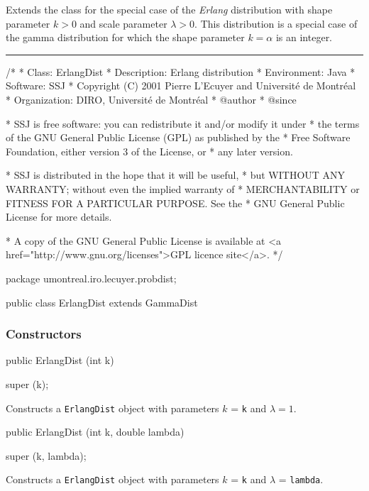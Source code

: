 
Extends the class  for the special case
of the {\em Erlang\/} distribution with
shape parameter $k > 0$ and scale parameter $\lambda > 0$.
This distribution is a special case of the gamma distribution
for which the shape parameter $k=\alpha$ is an integer.

\bigskip\hrule

\begin{code}
\begin{hide}
/*
 * Class:        ErlangDist
 * Description:  Erlang distribution
 * Environment:  Java
 * Software:     SSJ 
 * Copyright (C) 2001  Pierre L'Ecuyer and Université de Montréal
 * Organization: DIRO, Université de Montréal
 * @author       
 * @since

 * SSJ is free software: you can redistribute it and/or modify it under
 * the terms of the GNU General Public License (GPL) as published by the
 * Free Software Foundation, either version 3 of the License, or
 * any later version.

 * SSJ is distributed in the hope that it will be useful,
 * but WITHOUT ANY WARRANTY; without even the implied warranty of
 * MERCHANTABILITY or FITNESS FOR A PARTICULAR PURPOSE.  See the
 * GNU General Public License for more details.

 * A copy of the GNU General Public License is available at
   <a href="http://www.gnu.org/licenses">GPL licence site</a>.
 */
\end{hide}
package umontreal.iro.lecuyer.probdist;

public class ErlangDist extends GammaDist\begin{hide} {
\end{hide}\end{code}
\subsubsection* {Constructors}

\begin{code}

   public ErlangDist (int k)\begin{hide} {
      super (k);
   }\end{hide}
\end{code}
  \begin{tabb} Constructs a \texttt{ErlangDist} object with parameters
  $k$ = \texttt{k} and $\lambda=1$.
  \end{tabb}
\begin{code}

   public ErlangDist (int k, double lambda)\begin{hide} {
      super (k, lambda);
   }\end{hide}
\end{code}
  \begin{tabb} Constructs a \texttt{ErlangDist} object with parameters
  $k$ = \texttt{k}  and $\lambda$ = \texttt{lambda}.
  \end{tabb}

